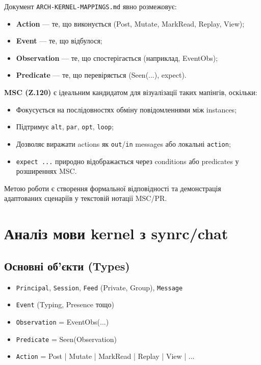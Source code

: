 \documentclass{article}
\begin{document}
Документ \texttt{ARCH-KERNEL-MAPPINGS.md} явно розмежовує:
\begin{itemize}
    \item \textbf{Action} — те, що виконується (Post, Mutate, MarkRead, Replay, View);
    \item \textbf{Event} — те, що відбулося;
    \item \textbf{Observation} — те, що спостерігається (наприклад, EventObs);
    \item \textbf{Predicate} — те, що перевіряється (Seen(...), expect).
\end{itemize}

\textbf{MSC (Z.120)} є ідеальним кандидатом для візуалізації таких мапінгів, оскільки:
\begin{itemize}
    \item Фокусується на послідовностях обміну повідомленнями між instances;
    \item Підтримує \texttt{alt}, \texttt{par}, \texttt{opt}, \texttt{loop};
    \item Дозволяє виражати actions як \texttt{out}/\texttt{in} messages або локальні \texttt{action};
    \item \texttt{expect ...} природно відображається через conditions або predicates у розширеннях MSC.
\end{itemize}

Метою роботи є створення формальної відповідності та демонстрація адаптованих сценаріїв у текстовій нотації MSC/PR.

\section{Аналіз мови kernel з synrc/chat}

\subsection{Основні об'єкти (Types)}
\begin{itemize}
    \item \texttt{Principal}, \texttt{Session}, \texttt{Feed} (Private, Group), \texttt{Message}
    \item \texttt{Event} (Typing, Presence тощо)
    \item \texttt{Observation} = EventObs(...)
    \item \texttt{Predicate} = Seen(Observation)
    \item \texttt{Action} = Post | Mutate | MarkRead | Replay | View | ...
\end{itemize}
\end{document}
